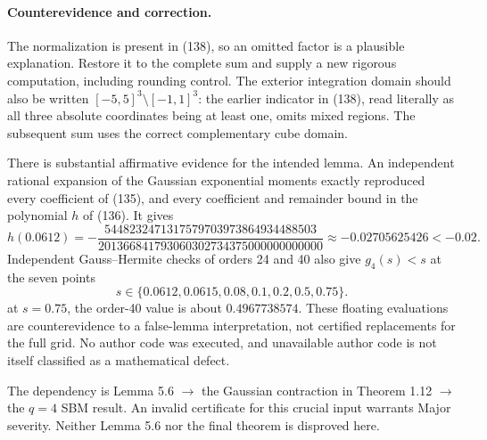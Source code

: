 \documentclass[10pt]{article}
\begin{document}
\paragraph*{Counterevidence and correction.}\mbox{}\par
The normalization is present in (138), so an omitted factor is a plausible explanation. Restore it to the complete sum and supply a new rigorous computation, including rounding control. The exterior integration domain should also be written \([-5,5]^3\setminus[-1,1]^3\): the earlier indicator in (138), read literally as all three absolute coordinates being at least one, omits mixed regions. The subsequent sum uses the correct complementary cube domain.\par
There is substantial affirmative evidence for the intended lemma. An independent rational expansion of the Gaussian exponential moments exactly reproduced every coefficient of (135), and every coefficient and remainder bound in the polynomial \(h\) of (136). It gives \[h(0.0612)
 =-\frac{5448232471317579703973864934488503}
          {201366841793060302734375000000000000}
 \approx-0.02705625426<-0.02.\] Independent Gauss–Hermite checks of orders 24 and 40 also give \(g_4(s)<s\) at the seven points \[s\in\{0.0612,0.0615,0.08,0.1,0.2,0.5,0.75\}.\] at \(s=0.75\), the order-40 value is about \(0.4967738574\). These floating evaluations are counterevidence to a false-lemma interpretation, not certified replacements for the full grid. No author code was executed, and unavailable author code is not itself classified as a mathematical defect.\par
The dependency is Lemma 5.6 \(\to\) the Gaussian contraction in Theorem 1.12 \(\to\) the \(q=4\) SBM result. An invalid certificate for this crucial input warrants Major severity. Neither Lemma 5.6 nor the final theorem is disproved here.\par
\end{document}
